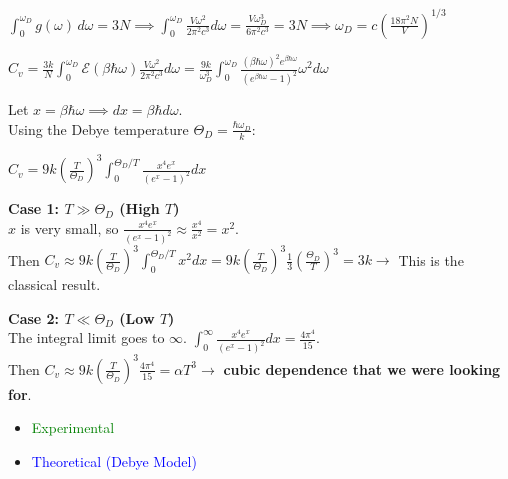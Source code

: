 \documentclass[12pt,a4paper]{report}
\newcommand{\esp}{\vspace{0.5cm}}
\begin{document}
	\esp
	
	$\int_0^{\omega_D} g(\omega) \, d\omega = 3N \implies \int_0^{\omega_D} \frac{V\omega^2}{2\pi^2 c^3} d\omega = \frac{V\omega_D^3}{6\pi^2 c^3} = 3N \implies \omega_D = c \left( \frac{18\pi^2 N}{V} \right)^{1/3}$
	
	\esp
	
	
	\esp
	
	$C_v = \frac{3k}{N} \int_0^{\omega_D} \mathcal{E}(\beta\hbar\omega) \frac{V\omega^2}{2\pi^2 c^3} d\omega = \frac{9k}{\omega_D^3} \int_0^{\omega_D} \frac{(\beta\hbar\omega)^2 e^{\beta\hbar\omega}}{(e^{\beta\hbar\omega}-1)^2} \omega^2 d\omega$
	
	\esp
	
	Let $x = \beta\hbar\omega \implies dx = \beta\hbar d\omega$. \\
	Using the Debye temperature $\Theta_D = \frac{\hbar\omega_D}{k}$:
	
	\esp
	
	$C_v = 9k \left( \frac{T}{\Theta_D} \right)^3 \int_0^{\Theta_D/T} \frac{x^4 e^x}{(e^x-1)^2} dx$
	
	\esp
	
	\textbf{Case 1: $T \gg \Theta_D$ (High $T$)} \\
	$x$ is very small, so $\frac{x^4 e^x}{(e^x-1)^2} \approx \frac{x^4}{x^2} = x^2$. \\
	Then $C_v \approx 9k \left( \frac{T}{\Theta_D} \right)^3 \int_0^{\Theta_D/T} x^2 dx = 9k \left( \frac{T}{\Theta_D} \right)^3 \frac{1}{3} \left( \frac{\Theta_D}{T} \right)^3 = 3k \to$ This is the classical result.
	
	\esp
	
	\textbf{Case 2: $T \ll \Theta_D$ (Low $T$)} \\
	The integral limit goes to $\infty$. $\int_0^{\infty} \frac{x^4 e^x}{(e^x-1)^2} dx = \frac{4\pi^4}{15}$. \\
	Then $C_v \approx 9k \left( \frac{T}{\Theta_D} \right)^3 \frac{4\pi^4}{15} = \alpha T^3 \to$ \textbf{cubic dependence that we were looking for}.
	
	\esp
	
	\begin{itemize}
		\item \textcolor{green}{Experimental}
		\item \textcolor{blue}{Theoretical (Debye Model)}
	\end{itemize}
	
	
	\printbibliography[title={Bibliografía}]
\end{document}
